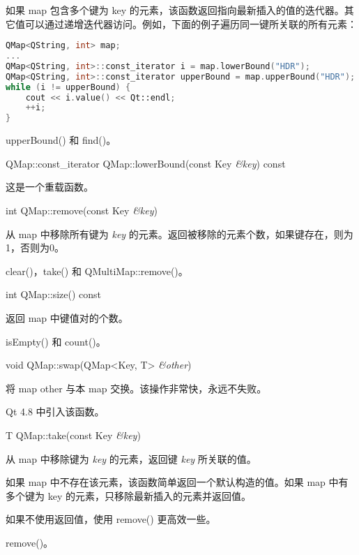如果 map 包含多个键为 key 的元素，该函数返回指向最新插入的值的迭代器。其它值可以通过递增迭代器访问。例如，下面的例子遍历同一键所关联的所有元素：

\begin{lstlisting}[language=C++]
QMap<QString, int> map;
...
QMap<QString, int>::const_iterator i = map.lowerBound("HDR");
QMap<QString, int>::const_iterator upperBound = map.upperBound("HDR");
while (i != upperBound) {
    cout << i.value() << Qt::endl;
    ++i;
}
\end{lstlisting}

\begin{notice}[另请参阅]
upperBound() 和 find()。
\end{notice}
    

QMap::const\_iterator QMap::lowerBound(const Key \emph{\&key}) const

这是一个重载函数。

\splitLine

int QMap::remove(const Key \emph{\&key})

从 map 中移除所有键为 \emph{key} 的元素。返回被移除的元素个数，如果键存在，则为1，否则为0。

\begin{notice}[另请参阅]
clear()，take() 和 QMultiMap::remove()。
\end{notice}

\splitLine

int QMap::size() const

返回 map 中键值对的个数。

\begin{notice}[另请参阅]
isEmpty() 和 count()。
\end{notice}
    

\splitLine

void QMap::swap(QMap<Key, T> \emph{\&other})

将 map other 与本 map 交换。该操作非常快，永远不失败。

Qt 4.8 中引入该函数。

\splitLine

T QMap::take(const Key \emph{\&key})

从 map 中移除键为 \emph{key} 的元素，返回键 \emph{key} 所关联的值。

如果 map 中不存在该元素，该函数简单返回一个默认构造的值。如果 map 中有多个键为 key 的元素，只移除最新插入的元素并返回值。

如果不使用返回值，使用 remove() 更高效一些。

\begin{notice}[另请参阅]
remove()。
\end{notice}

